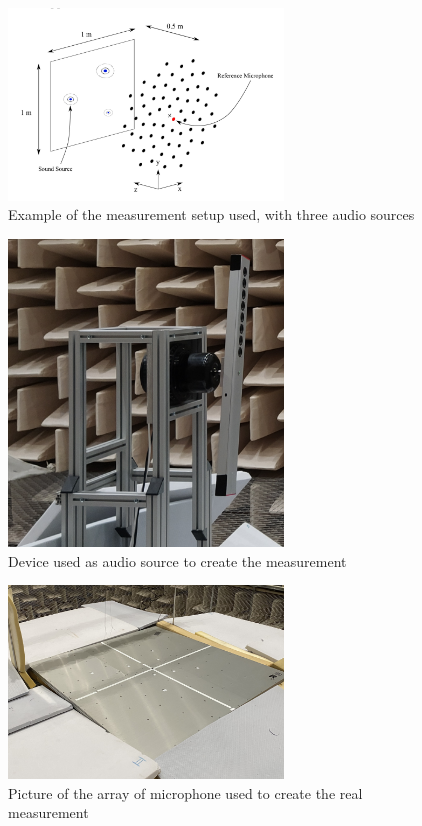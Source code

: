 \documentclass{article}
\begin{document}
\begin{figure}
    \centering
    \includegraphics[width=0.65\textwidth]{../figs/full_measurement_setup.png}
    \caption{Example of the measurement setup used, with three audio sources}
    \label{fig:full_measurement_setup}
\end{figure} 

\begin{figure}
    \centering
    \includegraphics[width=0.65\textwidth]{../figs/source.png}
    \caption{Device used as audio source to create the measurement}
    \label{fig:source}
\end{figure}

\begin{figure}
    \centering
    \includegraphics[width=0.65\textwidth]{../figs/microphone_array_cropped.jpg}
    \caption{Picture of the array of microphone used to create the real measurement}
    \label{fig:microphone_array}
\end{figure}    
\end{document}
